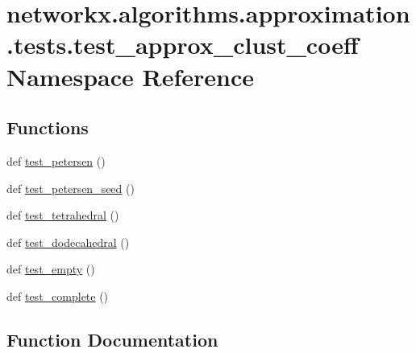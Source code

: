 \hypertarget{namespacenetworkx_1_1algorithms_1_1approximation_1_1tests_1_1test__approx__clust__coeff}{}\section{networkx.\+algorithms.\+approximation.\+tests.\+test\+\_\+approx\+\_\+clust\+\_\+coeff Namespace Reference}
\label{namespacenetworkx_1_1algorithms_1_1approximation_1_1tests_1_1test__approx__clust__coeff}
\subsection*{Functions}
\begin{DoxyCompactItemize}
\item 
def \hyperlink{namespacenetworkx_1_1algorithms_1_1approximation_1_1tests_1_1test__approx__clust__coeff_aa843ecb3c177363ed2209adb4a7d6a4b}{test\+\_\+petersen} ()
\item 
def \hyperlink{namespacenetworkx_1_1algorithms_1_1approximation_1_1tests_1_1test__approx__clust__coeff_a2da1d520d0962a7a8e33fdf80bdfa014}{test\+\_\+petersen\+\_\+seed} ()
\item 
def \hyperlink{namespacenetworkx_1_1algorithms_1_1approximation_1_1tests_1_1test__approx__clust__coeff_a78c2ee2a7c0b20aa9501e16e47b15137}{test\+\_\+tetrahedral} ()
\item 
def \hyperlink{namespacenetworkx_1_1algorithms_1_1approximation_1_1tests_1_1test__approx__clust__coeff_a397790728da7f00b2f015a61b0236f94}{test\+\_\+dodecahedral} ()
\item 
def \hyperlink{namespacenetworkx_1_1algorithms_1_1approximation_1_1tests_1_1test__approx__clust__coeff_af0a00f487a5183e16a490d5b497a0e3a}{test\+\_\+empty} ()
\item 
def \hyperlink{namespacenetworkx_1_1algorithms_1_1approximation_1_1tests_1_1test__approx__clust__coeff_ac32f89ef77650f920de23861ad09bf89}{test\+\_\+complete} ()
\end{DoxyCompactItemize}


\subsection{Function Documentation}
\mbox{\label{namespacenetworkx_1_1algorithms_1_1approximation_1_1tests_1_1test__approx__clust__coeff_ac32f89ef77650f920de23861ad09bf89}} 
